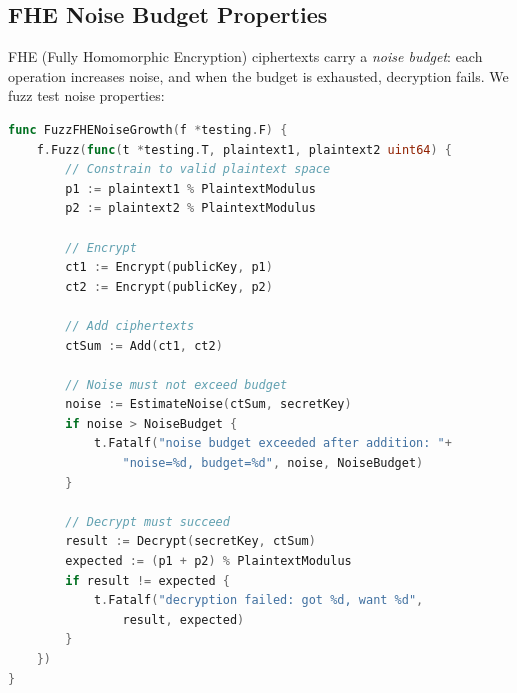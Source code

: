 \subsection{FHE Noise Budget Properties}

FHE (Fully Homomorphic Encryption) ciphertexts carry a \emph{noise budget}: each
operation increases noise, and when the budget is exhausted, decryption fails. We fuzz
test noise properties:

\begin{lstlisting}[language=Go,caption={FHE noise budget fuzz test}]
func FuzzFHENoiseGrowth(f *testing.F) {
    f.Fuzz(func(t *testing.T, plaintext1, plaintext2 uint64) {
        // Constrain to valid plaintext space
        p1 := plaintext1 % PlaintextModulus
        p2 := plaintext2 % PlaintextModulus

        // Encrypt
        ct1 := Encrypt(publicKey, p1)
        ct2 := Encrypt(publicKey, p2)

        // Add ciphertexts
        ctSum := Add(ct1, ct2)

        // Noise must not exceed budget
        noise := EstimateNoise(ctSum, secretKey)
        if noise > NoiseBudget {
            t.Fatalf("noise budget exceeded after addition: "+
                "noise=%d, budget=%d", noise, NoiseBudget)
        }

        // Decrypt must succeed
        result := Decrypt(secretKey, ctSum)
        expected := (p1 + p2) % PlaintextModulus
        if result != expected {
            t.Fatalf("decryption failed: got %d, want %d",
                result, expected)
        }
    })
}
\end{lstlisting}

